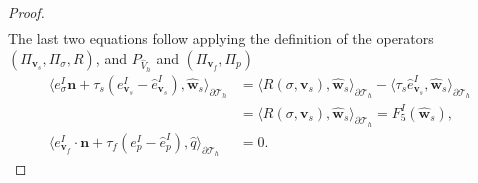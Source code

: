 \documentclass[10pt,letterpaper]{amsart}
\theoremstyle{plain} %
\theoremstyle{remark} %
\newcommand{\vect}[1]{\mathbf{#1}}
\newcommand{\pThprod}[2]{\langle #1, #2 \rangle_{\partial \mathcal{T}_{h}}}
\begin{document}
\begin{proof}
\begin{multline*}
	\end{multline*}
	The last two equations follow applying the definition of the operators $(\Pi_{\vect{v}_s}, \Pi_{\sigma}, R)$, and $P_{\widehat{V}_h}$ and $(\Pi_{\vect{v}_f}, \Pi_{p})$
	\begin{align*}
		\pThprod{e_{\sigma}^{I} \vect{n} + \tau_{s}(e_{\vect{v}_s}^{I} - \widehat{e}_{\vect{v}_s}^{I})}{\widehat{\vect{w}}_s}&=
		\pThprod{R(\sigma, \vect{v}_s) }{\widehat{\vect{w}}_s} - \pThprod{\tau_{s} \widehat{e}_{\vect{v}_s}^{I}}{\widehat{\vect{w}}_s} 
        \\
        &= \pThprod{R(\sigma, \vect{v}_s) }{\widehat{\vect{w}}_s} =F_5^{I}(\widehat{\vect{w}}_s),
		\\
		\pThprod{e_{\vect{v}_{f}}^{I}\cdot \vect{n} + \tau_{f}(e_{p}^{I} - \widehat{e}_{p}^{I})}{\widehat{q}}& = 0 .
	\end{align*}
\end{proof}

\end{document}
